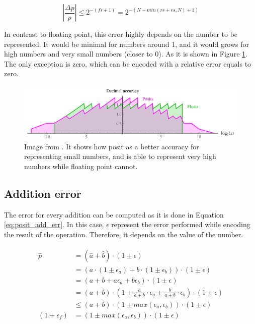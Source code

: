 \begin{equation}
	\left |\frac{\Delta p}{p} \right| \leq 2^{-(fs+1)} = 2^{-(N-min(rs+es, N)+1)}
	\label{eq:posit_enc_error}
\end{equation}


In contrast to floating point, this error highly depends on the number to be represented. It would be minimal for numbers around 1, and it would grows for high numbers and very small numbers (closer to 0). As it is shown in Figure \ref{fig:bfp}. The only exception is zero, which can be encoded with a relative error equals to zero.

\begin{figure}[!ht]
	\centering
	\includegraphics[width=0.9\linewidth]{../Images/decimal_accuracy.png}
	\caption{Image from \cite{bfp}. It shows how posit as a better accuracy for representing small numbers, and is able to represent very high numbers while floating point cannot.}
	\label{fig:bfp}
\end{figure}


\subsection{Addition error}
The error for every addition can be computed as it is done in Equation \ref{eq:posit_add_err}. In this case, $\epsilon$ represent the error performed while encoding the result of the operation. Therefore, it depends on the value of the number.

\begin{align}
\begin{split}
\hat{p} &= (\hat{a} + \hat{b}) \cdot (1 \pm \epsilon)\\
		&= (a \cdot (1 \pm \epsilon_a) + b \cdot (1 \pm \epsilon_b))\cdot (1 \pm \epsilon)\\
		&= (a + b + a \epsilon_a + b \epsilon_b) \cdot (1 \pm \epsilon) \\
		&= (a + b) \cdot \left(1 \pm \frac{a}{a + b} \cdot \epsilon_a \pm \frac{b}{a+b} \cdot \epsilon_b \right) \cdot (1 \pm \epsilon) \\
		&\leq (a+b) \cdot (1 \pm max(\epsilon_a, \epsilon_b)) \cdot (1 \pm \epsilon)\\
(1+\epsilon_f) &= (1 \pm max(\epsilon_a, \epsilon_b)) \cdot (1 \pm \epsilon)
\end{split}
\label{eq:posit_add_err}
\end{align}


